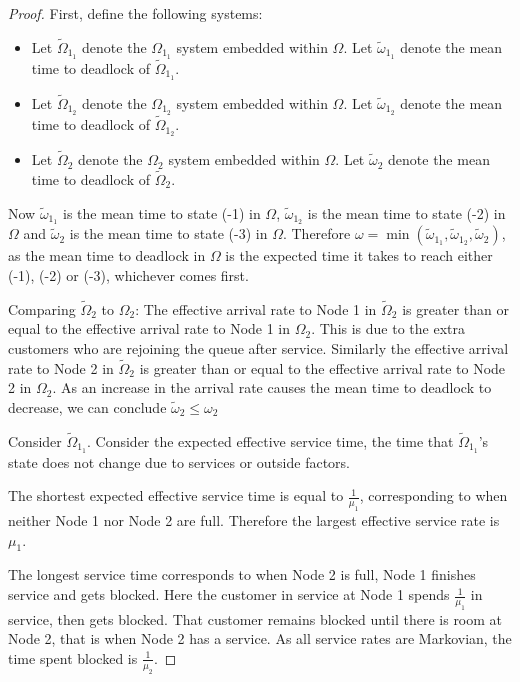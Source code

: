 \documentclass{article}
\begin{document}
\begin{proof}
First, define the following systems:
\begin{itemize}
  \item Let $\widetilde{\Omega}_{1_1}$ denote the $\Omega_{1_1}$ system embedded within $\Omega$. Let $\widetilde{\omega}_{1_1}$ denote the mean time to deadlock of $\widetilde{\Omega}_{1_1}$.
  \item Let $\widetilde{\Omega}_{1_2}$ denote the $\Omega_{1_2}$ system embedded within $\Omega$. Let $\widetilde{\omega}_{1_2}$ denote the mean time to deadlock of $\widetilde{\Omega}_{1_2}$.
  \item Let $\widetilde{\Omega}_2$ denote the $\Omega_2$ system embedded within $\Omega$. Let $\widetilde{\omega}_2$ denote the mean time to deadlock of $\widetilde{\Omega}_2$.
\end{itemize}

Now $\widetilde{\omega}_{1_1}$ is the mean time to state (-1) in $\Omega$, $\widetilde{\omega}_{1_2}$ is the mean time to state (-2) in $\Omega$ and $\widetilde{\omega}_2$ is the mean time to state (-3) in $\Omega$.
Therefore $\omega = \min(\widetilde{\omega}_{1_1}, \widetilde{\omega}_{1_2}, \widetilde{\omega}_2)$, as the mean time to deadlock in $\Omega$ is the expected time it takes to reach either (-1), (-2) or (-3), whichever comes first.

Comparing $\widetilde{\Omega}_2$ to $\Omega_2$:
The effective arrival rate to Node 1 in $\widetilde{\Omega}_2$ is greater than or equal to the effective arrival rate to Node 1 in $\Omega_2$.
This is due to the extra customers who are rejoining the queue after service.
Similarly the effective arrival rate to Node 2 in $\widetilde{\Omega}_2$ is greater than or equal to the effective arrival rate to Node 2 in $\Omega_2$.
As an increase in the arrival rate causes the mean time to deadlock to decrease, we can conclude $\widetilde{\omega}_2 \leq \omega_2$

Consider $\widetilde{\Omega}_{1_1}$.
Consider the expected effective service time, the time that $\widetilde{\Omega}_{1_1}$'s state does not change due to services or outside factors.

The shortest expected effective service time is equal to $\frac{1}{\mu_1}$, corresponding to when neither Node 1 nor Node 2 are full.
Therefore the largest effective service rate is $\mu_1$.

The longest service time corresponds to when Node 2 is full, Node 1 finishes service and gets blocked.
Here the customer in service at Node 1 spends $\frac{1}{\mu_1}$ in service, then gets blocked.
That customer remains blocked until there is room at Node 2, that is when Node 2 has a service.
As all service rates are Markovian, the time spent blocked is $\frac{1}{\mu_2}$.


\end{proof}
\end{document}
